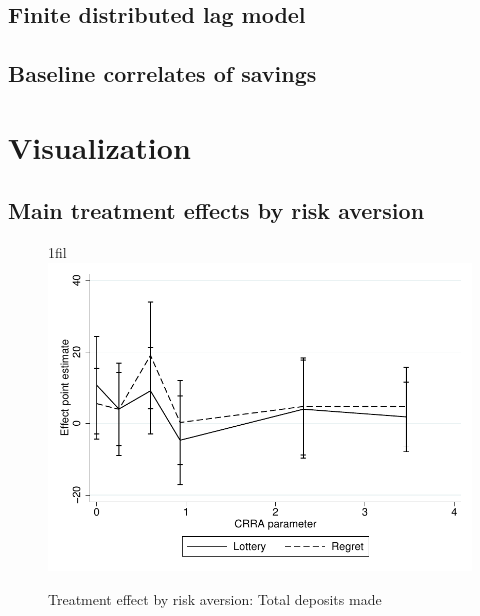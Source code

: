 \documentclass[11pt]{article}
\makeatletter
\newcommand*{\centerfloat}{%
  \parindent \z@
  \leftskip \z@ \@plus 1fil \@minus \textwidth
  \rightskip\leftskip
  \parfillskip \z@skip}
\makeatother
\begin{document}
    \subsection{Finite distributed lag model}

        
        

    \clearpage

    \subsection{Baseline correlates of savings}

        
        

    \clearpage

\section{Visualization}

	\subsection{Main treatment effects by risk aversion}

		\begin{figure}[h]
		\centering
		\caption{Treatment effect by risk aversion: Total deposits made}
		\centerfloat
		\includegraphics[width=\textwidth]{../../figures/line-mobile_totdepositsbyrisk.pdf}
		\end{figure}
\end{document}
